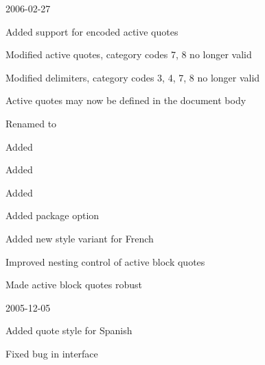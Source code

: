 \documentclass{ltxdockit}[2010/09/26]
\begin{document}
\begin{changelog}
\begin{release}{3.3}{2006-02-27}
\item Added support for \utf encoded active quotes
\item Modified active quotes, category codes 7, 8 no longer valid
\item Modified delimiters, category codes 3, 4, 7, 8 no longer valid
\item Active quotes may now be defined in the document body
\item Renamed  to 
\item Added 
\item Added 
\item Added 
\item Added package option 
\item Added new style variant for French
\item Improved nesting control of active block quotes
\item Made active block quotes robust
\end{release}

\begin{release}{3.2}{2005-12-05}
\item Added quote style for Spanish
\item Fixed bug in  interface
\end{release}


\end{changelog}
\end{document}
